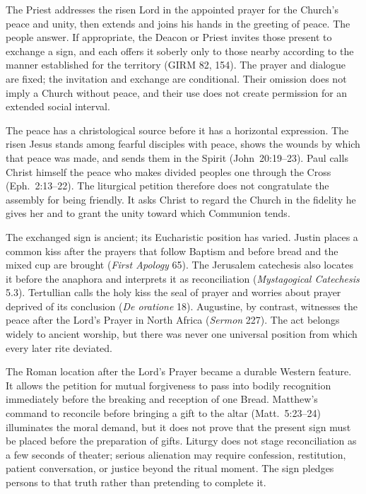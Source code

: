 The Priest addresses the risen Lord in the appointed prayer for the Church's peace and unity, then extends and joins his hands in the greeting of peace. The people answer. If appropriate, the Deacon or Priest invites those present to exchange a sign, and each offers it soberly only to those nearby according to the manner established for the territory (GIRM 82, 154). The prayer and dialogue are fixed; the invitation and exchange are conditional. Their omission does not imply a Church without peace, and their use does not create permission for an extended social interval.

The peace has a christological source before it has a horizontal expression. The risen Jesus stands among fearful disciples with peace, shows the wounds by which that peace was made, and sends them in the Spirit (John~20:19--23). Paul calls Christ himself the peace who makes divided peoples one through the Cross (Eph.~2:13--22). The liturgical petition therefore does not congratulate the assembly for being friendly. It asks Christ to regard the Church in the fidelity he gives her and to grant the unity toward which Communion tends.

The exchanged sign is ancient; its Eucharistic position has varied. Justin places a common kiss after the prayers that follow Baptism and before bread and the mixed cup are brought (\emph{First Apology} 65). The Jerusalem catechesis also locates it before the anaphora and interprets it as reconciliation (\emph{Mystagogical Catechesis} 5.3). Tertullian calls the holy kiss the seal of prayer and worries about prayer deprived of its conclusion (\emph{De oratione} 18). Augustine, by contrast, witnesses the peace after the Lord's Prayer in North Africa (\emph{Sermon} 227). The act belongs widely to ancient worship, but there was never one universal position from which every later rite deviated.

The Roman location after the Lord's Prayer became a durable Western feature. It allows the petition for mutual forgiveness to pass into bodily recognition immediately before the breaking and reception of one Bread. Matthew's command to reconcile before bringing a gift to the altar (Matt.~5:23--24) illuminates the moral demand, but it does not prove that the present sign must be placed before the preparation of gifts. Liturgy does not stage reconciliation as a few seconds of theater; serious alienation may require confession, restitution, patient conversation, or justice beyond the ritual moment. The sign pledges persons to that truth rather than pretending to complete it.

